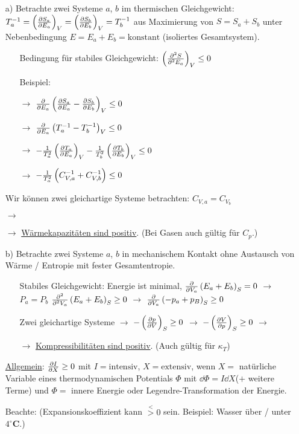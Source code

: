 \begin{itemize}[align=left]
  \item[a)] Betrachte zwei Systeme $a$, $b$ im thermischen Gleichgewicht: $T_a^{-1} = \pdv{S_a}{E_a}{V} = \pdv{S_b}{E_b}{V} = T_b^{-1}$ aus Maximierung von $S = S_a + S_b$ unter Nebenbedingung $E = E_a + E_b = \text{konstant}$ (isoliertes Gesamtsystem). \begin{itemize}[align=left]
    \item[Bedingung für stabiles Gleichgewicht:] $\npdv{S}{E_a}{V}{2} \leq 0$
    \item[Beispiel:] 
    \item[$\rightarrow$] $\ppv{}{E_a}\norBra{\ppv{S_a}{E_a} - \ppv{S_b}{E_b}}_V \leq 0$
    \item[$\rightarrow$] $\ppv{}{E_a}\norBra{T_a^{-1} - T_b^{-1}}_V \leq 0$
    \item[$\rightarrow$] $-\frac{1}{T_a^2}\pdv{T_a}{E_a}{V} - \frac{1}{T_b^2}\pdv{T_b}{E_b}{V} \leq 0$
    \item[$\rightarrow$] $-\frac{1}{T_a^2}\norBra{C_{V,a}^{-1} + C_{V,b}^{-1}} \leq 0$
  \end{itemize}
  \item[Wir können zwei gleichartige Systeme betrachten:] $C_{V,a} = C_{V_b}$
  \item[$\rightarrow$] 
  \item[$\rightarrow$] \uline{Wärmekapazitäten sind positiv}. (Bei Gasen auch gültig für $C_p$.)
  \item[b)] Betrachte zwei Systeme $a$, $b$ in mechanischem Kontakt ohne Austausch von Wärme / Entropie mit fester Gesamtentropie. \begin{itemize}[align=left]
    \item[Stabiles Gleichgewicht:] Energie ist minimal, $\ppv{}{V_a}\norBra{E_a+E_b}_S = 0$ $\rightarrow$ $P_a = P_b$ $\nppv{}{V_a}{2}\norBra{E_a + E_b}_S \geq 0$ $\rightarrow$ $\ppv{}{V_a}\norBra{-p_a + p_B}_S \geq 0$
    \item[Zwei gleichartige Systeme] $\rightarrow$ $-\pdv{p}{V}{S} \geq 0$ $\rightarrow$ $-\pdv{V}{p}{S} \geq 0$ $\rightarrow$ 
    \item[$\rightarrow$] \uline{Kompressibilitäten sind positiv}. (Auch gültig für $\kappa_T$)
  \end{itemize}
  \item[\uline{Allgemein}:] $\ppv{I}{X} \geq 0$ mit $I = \text{intensiv}$, $X = \text{extensiv}$, wenn $X=$ natürliche Variable eines thermodynamischen Potentials $\Phi$ mit $\dd{\Phi} = I \dd{X}$($+$ weitere Terme) und $\Phi=$ innere Energie oder Legendre-Transformation der Energie.
  \item[Beachte:] (Expansionskoeffizient kann $\stackrel{<}{>} 0$ sein. Beispiel: Wasser über / unter $4^\circ \textbf{C}$.)
\end{itemize}

